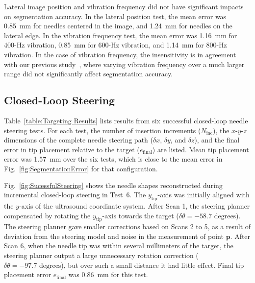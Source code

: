 Lateral image position and vibration frequency did not have significant impacts on segmentation accuracy. In the lateral position test, the mean error was 0.85~mm for needles centered in the image, and 1.24~mm for needles on the lateral edge. In the vibration frequency test, the mean error was 1.16~mm for 400-Hz vibration, 0.85~mm for 600-Hz vibration, and 1.14~mm for 800-Hz vibration. In the case of vibration frequency, the insensitivity is in agreement with our previous study~\cite{Adebar2013}, where varying vibration frequency over a much larger range did not significantly affect segmentation accuracy. 

\subsection{Closed-Loop Steering}
Table~\ref{table:Targeting Results} lists results from six successful closed-loop needle steering tests. For each test, the number of insertion increments ($N_{\text{inc}}$), the $x$-$y$-$z$ dimensions of the complete needle steering path ($\delta x$, $\delta y$, and $\delta z$), and the final error in tip placement relative to the target ($e_{\text{final}}$) are listed. Mean tip placement error was 1.57~mm over the six tests, which is close to the mean error in Fig.~\ref{fig:SegmentationError} for that configuration. 

Fig.~\ref{fig:SucessfulSteering} shows the needle shapes reconstructed during incremental closed-loop steering in Test~6. The $y_{\text{tip}}$-axis was initially aligned with the $y$-axis of the ultrasound coordinate system. After Scan 1, the steering planner compensated by rotating the $y_{\text{tip}}$-axis towards the target ($\delta\theta = -58.7 \text{ degrees}$). The steering planner gave smaller corrections based on Scans 2 to 5, as a result of deviation from the steering model and noise in the measurement of point $\bm{p}$. After Scan 6, when the needle tip was within several millimeters of the target, the steering planner output a large unnecessary rotation correction ($\delta\theta = -97.7 \text{ degrees}$), but over such a small distance it had little effect. Final tip placement error $e_{\text{final}}$ was 0.86~mm for this test.

